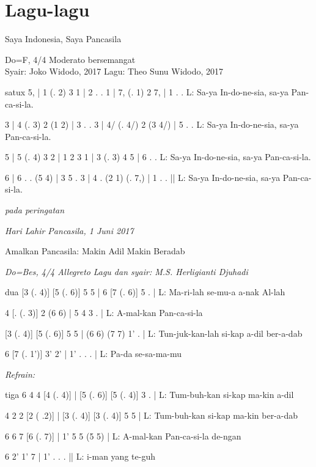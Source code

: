 \newpage
\chapter{Lagu-lagu}
\begin{center}
{\huge Saya Indonesia, Saya Pancasila}


{\normalsize Do=F, 4/4 Moderato bersemangat}\\
Syair: Joko Widodo, 2017 \hfill Lagu: Theo Sunu Widodo, 2017
\end{center}
\begin{numnot}[1]{satux}
5, | 1 (. 2) 3 1 | 2 . . 1 | 7, (. 1) 2 7, | 1 . .
L: Sa-ya In-do-ne-sia, sa-ya Pan-ca-si-la.

3 | 4 (. 3) 2 {(1 2)} | 3 . . 3 | 4/ (. 4/) 2 {(3 4/)} | 5 . .
L: Sa-ya In-do-ne-sia, sa-ya Pan-ca-si-la.

5 | 5 (. 4) 3 2 | {1 2 3} 1 | 3 (. 3) 4 5 | 6 . .
L: Sa-ya In-do-ne-sia, sa-ya Pan-ca-si-la.

6 | 6 . . (5 4) | 3 5 . 3 | 4 . (2 1) (. 7,) | 1 . . ||
L: Sa-ya In-do-ne-sia, sa-ya Pan-ca-si-la.
\end{numnot}
{\hfill \textit{pada peringatan}}

{\hfill \textit{Hari Lahir Pancasila, 1 Juni 2017}}

\newpage
{}
\begin{center}
	{\Large Amalkan Pancasila: Makin Adil Makin Beradab}
	
	{\normalsize \textit{Do=Bes, 4/4 Allegreto}}
	{\hfill \textit{Lagu dan syair: M.S. Herligianti Djuhadi}}
\end{center}

\begin{numnot}[1]{dua}
	[3 (. 4)] [5 (. 6)] 5 5 | 6 [7 (. 6)] 5 . |
	L: Ma-ri-lah se-mu-a a-nak Al-lah
	
	4 [. (. 3)] 2 (6 6) | {5 4} 3 . |
	L: A-mal-kan Pan-ca-si-la
	
	[3 (. 4)] [5 (. 6)] 5 5 | (6 6) (7 7) 1' . |
	L: Tun-juk-kan-lah si-kap a-dil ber-a-dab
	
	6 [7 (. 1')] 3' 2' | 1' . . . |
	L: Pa-da se-sa-ma-mu
\end{numnot}

\textit{Refrain:}
\begin{numnot}[1]{tiga}
	6 4 4 [4 (. 4)] | [5 (. 6)] {[5 (. 4)]} 3 . |
	L: Tum-buh-kan si-kap ma-kin a-dil
	
	4 2 2 [2 ( .2)] | {[3 (. 4)]} [3 (. 4)] 5 5 |
	L: Tum-buh-kan si-kap ma-kin ber-a-dab
	
	6 6 7 [6 (. 7)] | {1' 5} 5 (5 5) |
	L: A-mal-kan Pan-ca-si-la de-ngan
	
	6 2' 1' 7 | 1' . . . ||
	L: i-man yang te-guh
\end{numnot}

